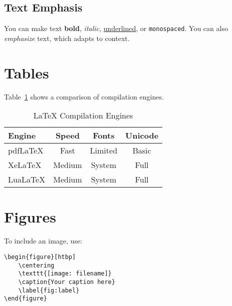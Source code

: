 \documentclass[11pt,a4paper]{article}
\begin{document}
\subsection{Text Emphasis}

You can make text \textbf{bold}, \textit{italic}, \underline{underlined}, or \texttt{monospaced}. You can also \emph{emphasize} text, which adapts to context.

\section{Tables}

Table~\ref{tab:comparison} shows a comparison of compilation engines.

\begin{table}[htbp]
    \centering
    \caption{LaTeX Compilation Engines}
    \label{tab:comparison}
    \begin{tabular}{|l|c|c|c|}
        \hline
        \textbf{Engine} & \textbf{Speed} & \textbf{Fonts} & \textbf{Unicode} \\
        \hline
        pdfLaTeX & Fast & Limited & Basic \\
        XeLaTeX & Medium & System & Full \\
        LuaLaTeX & Medium & System & Full \\
        \hline
    \end{tabular}
\end{table}

\section{Figures}




To include an image, use:
\begin{verbatim}
\begin{figure}[htbp]
    \centering
    \texttt{[image: filename]}
    \caption{Your caption here}
    \label{fig:label}
\end{figure}
\end{verbatim}
\end{document}
